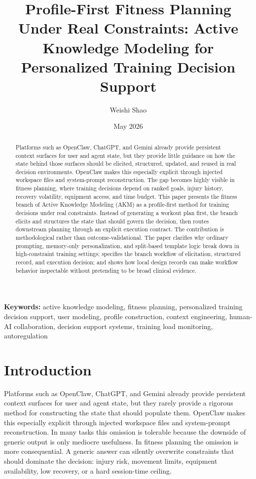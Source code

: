 \documentclass[11pt]{article}
\title{Profile-First Fitness Planning Under Real Constraints: Active Knowledge Modeling for Personalized Training Decision Support}
\author{Weishi Shao}
\date{May 2026}
\begin{document}
\maketitle
\begin{abstract}
Platforms such as OpenClaw, ChatGPT, and Gemini already provide persistent context surfaces for user and agent state, but they provide little guidance on how the state behind those surfaces should be elicited, structured, updated, and reused in real decision environments. OpenClaw makes this especially explicit through injected workspace files and system-prompt reconstruction. The gap becomes highly visible in fitness planning, where training decisions depend on ranked goals, injury history, recovery volatility, equipment access, and time budget. This paper presents the fitness branch of Active Knowledge Modeling (AKM) as a profile-first method for training decisions under real constraints. Instead of generating a workout plan first, the branch elicits and structures the state that should govern the decision, then routes downstream planning through an explicit execution contract. The contribution is methodological rather than outcome-validational. The paper clarifies why ordinary prompting, memory-only personalization, and split-based template logic break down in high-constraint training settings; specifies the branch workflow of elicitation, structured record, and execution decision; and shows how local design records can make workflow behavior inspectable without pretending to be broad clinical evidence.
\end{abstract}
\textbf{Keywords:} active knowledge modeling, fitness planning, personalized training decision support, user modeling, profile construction, context engineering, human-AI collaboration, decision support systems, training load monitoring, autoregulation
\section{Introduction}
Platforms such as OpenClaw, ChatGPT, and Gemini already provide persistent context surfaces for user and agent state, but they rarely provide a rigorous method for constructing the state that should populate them. OpenClaw makes this especially explicit through injected workspace files and system-prompt reconstruction. In many tasks this omission is tolerable because the downside of generic output is only mediocre usefulness. In fitness planning the omission is more consequential. A generic answer can silently overwrite constraints that should dominate the decision: injury risk, movement limits, equipment availability, low recovery, or a hard session-time ceiling.
\end{document}
